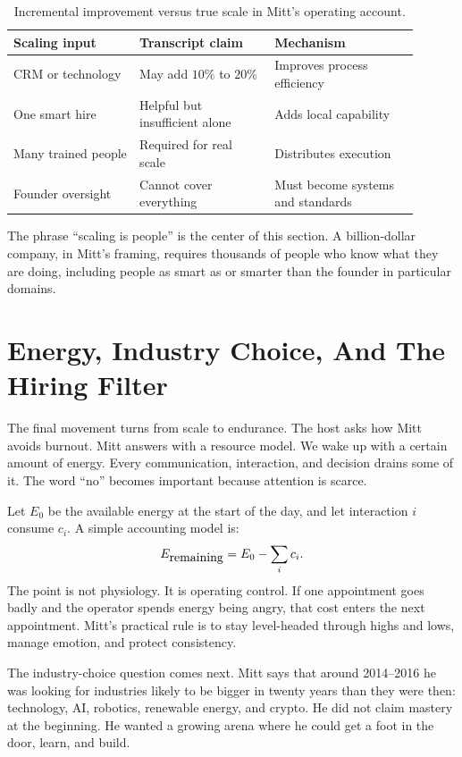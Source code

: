 \begin{table}
\centering
\begin{tabular}{p{0.28\linewidth}p{0.30\linewidth}p{0.32\linewidth}}
\hline
Scaling input & Transcript claim & Mechanism \\
\hline
CRM or technology &
May add \(10\%\) to \(20\%\) &
Improves process efficiency \\
One smart hire &
Helpful but insufficient alone &
Adds local capability \\
Many trained people &
Required for real scale &
Distributes execution \\
Founder oversight &
Cannot cover everything &
Must become systems and standards \\
\hline
\end{tabular}
\caption{Incremental improvement versus true scale in Mitt's operating account.}
\end{table}

The phrase ``scaling is people'' is the center of this section. A billion-dollar company, in Mitt's framing, requires thousands of people who know what they are doing, including people as smart as or smarter than the founder in particular domains.

\section{Energy, Industry Choice, And The Hiring Filter}

The final movement turns from scale to endurance. The host asks how Mitt avoids burnout. Mitt answers with a resource model. We wake up with a certain amount of energy. Every communication, interaction, and decision drains some of it. The word ``no'' becomes important because attention is scarce.

Let \(E_0\) be the available energy at the start of the day, and let interaction \(i\) consume \(c_i\). A simple accounting model is:
\begin{equation}
  E_{\hbox{remaining}}
  =
  E_0-\sum_i c_i.
\end{equation}
The point is not physiology. It is operating control. If one appointment goes badly and the operator spends energy being angry, that cost enters the next appointment. Mitt's practical rule is to stay level-headed through highs and lows, manage emotion, and protect consistency.

The industry-choice question comes next. Mitt says that around 2014--2016 he was looking for industries likely to be bigger in twenty years than they were then: technology, AI, robotics, renewable energy, and crypto. He did not claim mastery at the beginning. He wanted a growing arena where he could get a foot in the door, learn, and build.

